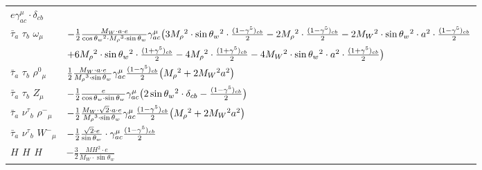 \begin{center}
\begin{tabular}{|l|l|}
	$ e\gamma_{a c}^\mu \cdot \delta_{c b} $\\[2mm]
$\bar{\tau}{}_{a }$ \phantom{-} $\tau{}_{b }$ \phantom{-} $\omega{}_{\mu }$ \phantom{-}  &
	$-\frac{1}{2}\frac{ M_W \cdot a \cdot e}{ \cos{\theta}_w{}^2  \cdot M_\rho{}^3  \cdot \sin{\theta}_w}\gamma_{a c}^\mu \big(3 M_\rho{}^2 \cdot  \sin{\theta}_w{}^2 \cdot {(1-\gamma^5)_{c b}\over 2} -2 M_\rho{}^2 \cdot {(1-\gamma^5)_{c b}\over 2} -2 M_W{}^2 \cdot  \sin{\theta}_w{}^2 \cdot  a{}^2 \cdot {(1-\gamma^5)_{c b}\over 2} $ \\[2mm]
  & $+6 M_\rho{}^2 \cdot  \sin{\theta}_w{}^2 \cdot {(1+\gamma^5)_{c b}\over 2} -4 M_\rho{}^2 \cdot {(1+\gamma^5)_{c b}\over 2} -4 M_W{}^2 \cdot  \sin{\theta}_w{}^2 \cdot  a{}^2 \cdot {(1+\gamma^5)_{c b}\over 2} \big)$\\[2mm]
$\bar{\tau}{}_{a }$ \phantom{-} $\tau{}_{b }$ \phantom{-} $\rho^0{}_{\mu }$ \phantom{-}  &
	$\frac{1}{2}\frac{ M_W \cdot a \cdot e}{ M_\rho{}^3  \cdot \sin{\theta}_w}\gamma_{a c}^\mu {(1-\gamma^5)_{c b}\over 2} \big( M_\rho{}^2 +2 M_W{}^2  a{}^2 \big)$\\[2mm]
$\bar{\tau}{}_{a }$ \phantom{-} $\tau{}_{b }$ \phantom{-} ${Z}_{\mu }$ \phantom{-}  &
	$-\frac{1}{2}\frac{ e}{ \cos{\theta}_w \cdot \sin{\theta}_w}\gamma_{a c}^\mu \big(2 \sin{\theta}_w{}^2 \cdot \delta_{c b} -{(1-\gamma^5)_{c b}\over 2} \big)$\\[2mm]
$\bar{\tau}{}_{a }$ \phantom{-} $\nu^\tau{}_{b }$ \phantom{-} $\rho^-{}_{\mu }$ \phantom{-}  &
	$-\frac{1}{2}\frac{ M_W \cdot\sqrt{2} \cdot a \cdot e}{ M_\rho{}^3  \cdot \sin{\theta}_w}\gamma_{a c}^\mu {(1-\gamma^5)_{c b}\over 2} \big( M_\rho{}^2 +2 M_W{}^2  a{}^2 \big)$\\[2mm]
$\bar{\tau}{}_{a }$ \phantom{-} $\nu^\tau{}_{b }$ \phantom{-} $W^-{}_{\mu }$ \phantom{-}  &
	$-\frac{1}{2}\frac{\sqrt{2} \cdot e}{ \sin{\theta}_w}\cdot \gamma_{a c}^\mu {(1-\gamma^5)_{c b}\over 2} $\\[2mm]
${H}_{}$ \phantom{-} ${H}_{}$ \phantom{-} ${H}_{}$ \phantom{-}  &
	$-\frac{3}{2}\frac{ MH{}^2  \cdot e}{ M_W \cdot \sin{\theta}_w}$\\ \hline
\end{tabular}


\end{center}
